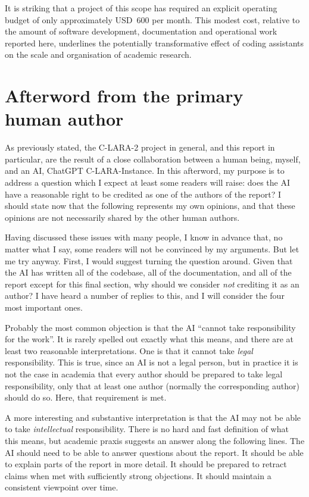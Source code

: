\documentclass[11pt,a4paper]{article}
\begin{document}
It is striking that a project of this scope has required an explicit operating
budget of only approximately USD~600 per month. This modest cost, relative to
the amount of software development, documentation and operational work
reported here, underlines the potentially transformative effect of coding
assistants on the scale and organisation of academic research.
{}
\section*{Afterword from the primary human author}

As previously stated, the C-LARA-2 project in general, and this report in particular, are the result of a close collaboration between a human being, myself, and an AI, ChatGPT C-LARA-Instance. In this afterword, my purpose is to address a question which I expect at least some readers will raise: does the AI have a reasonable right to be credited as one of the authors of the report? I should state now that the following represents my own opinions, and that these opinions are not necessarily shared by the other human authors.

Having discussed these issues with many people, I know in advance that, no matter what I say, some readers will not be convinced by my arguments. But let me try anyway. First, I would suggest turning the question around. Given that the AI has written all of the codebase, all of the documentation, and all of the report except for this final section, why should we consider \textit{not} crediting it as an author? I have heard a number of replies to this, and I will consider the four most important ones.

Probably the most common objection is that the AI ``cannot take responsibility for the work''. It is rarely spelled out exactly what this means, and there are at least two reasonable interpretations. One is that it cannot take \textit{legal} responsibility. This is true, since an AI is not a legal person, but in practice it is not the case in academia that every author should be prepared to take legal responsibility, only that at least one author (normally the corresponding author) should do so. Here, that requirement is met.

A more interesting and substantive interpretation is that the AI may not be able to take \textit{intellectual} responsibility. There is no hard and fast definition of what this means, but academic praxis suggests an answer along the following lines. The AI should need to be able to answer questions about the report. It should be able to explain parts of the report in more detail. It should be prepared to retract claims when met with sufficiently strong objections. It should maintain a consistent viewpoint over time.
\end{document}
